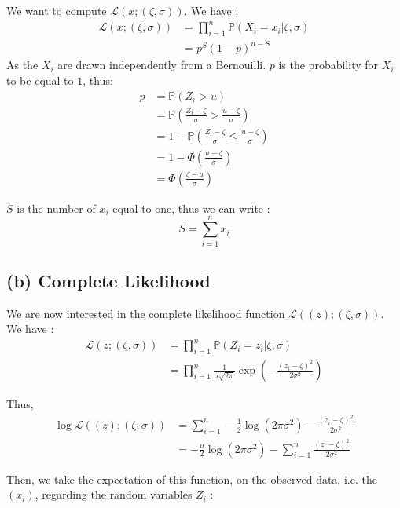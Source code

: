 \documentclass{article}
\begin{document}
We want to compute $\mathcal{L}(x; (\zeta, \sigma))$. We have :
\begin{align*}
    \mathcal{L}(x; (\zeta, \sigma)) &= 
                \prod_{i=1}^{n} \mathbb{P}(X_i = x_i | \zeta, \sigma) \\
            &=p^S (1-p)^{n-S}
\end{align*}
As the $X_i$ are drawn independently from a Bernouilli.
 $p$ is the probability for $X_i$ to be equal to $1$, thus:
 \begin{align*}
    p &= \mathbb{P}(Z_i > u) \\
    &= \mathbb{P}\left (\frac{Z_i-\zeta}{\sigma} > \frac{u-\zeta}{\sigma} \right ) \\
    &= 1- \mathbb{P}\left (\frac{Z_i-\zeta}{\sigma} \leq \frac{u-\zeta}{\sigma} \right ) \\
    &= 1-\Phi \left ( \frac{u-\zeta}{\sigma}  \right)\\
    &= \Phi \left( \frac{\zeta - u}{\sigma}  \right)
 \end{align*}

 \noindent $S$ is the number of $x_i$ equal to one, thus we can write :
 \[S = \sum_{i=1}^{n} x_i\]

 \subsection*{(b) Complete Likelihood}

 We are now interested in the complete likelihood function $\mathcal{L}((z); (\zeta, \sigma ))$. We have : 
 \begin{align*}
    \mathcal{L}(z; (\zeta, \sigma )) 
            &= \prod_{i=1}^{n} \mathbb{P}(Z_i = z_i | \zeta, \sigma) \\
            &= \prod_{i=1}^{n} \frac{1}{\sigma \sqrt{2\pi}} \exp \left (- \frac{(z_i - \zeta)^2}{2\sigma^2}\right )
 \end{align*}

Thus, 
\begin{align*}
   \log  \mathcal{L}(( z); (\zeta, \sigma ))  
     &= \sum_{i=1}^n - \frac{1}{2} \log (2\pi \sigma^2) - \frac{(z_i-\zeta)^2}{2\sigma^2} \\
    &= - \frac{n}{2} \log (2\pi \sigma^2) - \sum_{i=1}^n  \frac{(z_i-\zeta)^2}{2\sigma^2}
    \end{align*}

Then, we take the expectation of this function, on the observed data, i.e. the $(x_i)$, regarding the random
variables $Z_i$ : 
\end{document}
